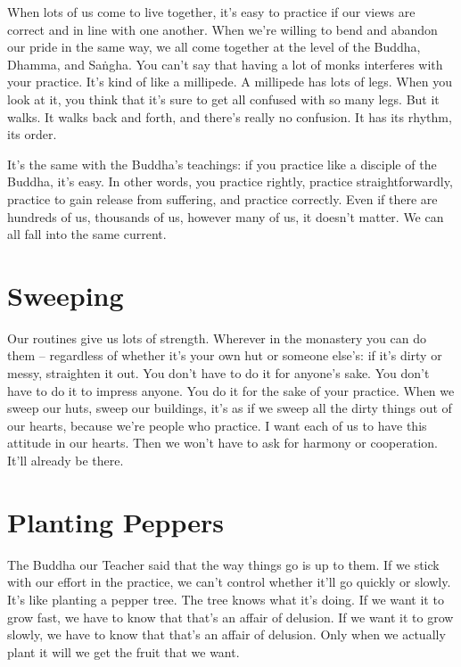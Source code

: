 When lots of us come to live together, it's easy to practice if our views are correct and in line with one another. When we're willing to bend and abandon our pride in the same way, we all come together at the level of the Buddha, Dhamma, and Sa\.ngha. You can't say that having a lot of monks interferes with your practice. It's kind of like a millipede. A millipede has lots of legs. When you look at it, you think that it's sure to get all confused with so many legs. But it walks. It walks back and forth, and there's really no confusion. It has its rhythm, its order. 

It's the same with the Buddha's teachings: if you practice like a disciple of the Buddha, it's easy. In other words, you practice rightly, practice straightforwardly, practice to gain release from suffering, and practice correctly. Even if there are hundreds of us, thousands of us, however many of us, it doesn't matter. We can all fall into the same current.

\clearpage

\section{Sweeping}

Our routines give us lots of strength. Wherever in the monastery you can do them -- regardless of whether it's your own hut or someone else's: if it's dirty or messy, straighten it out. You don't have to do it for anyone's sake. You don't have to do it to impress anyone. You do it for the sake of your practice. When we sweep our huts, sweep our buildings, it's as if we sweep all the dirty things out of our hearts, because we're people who practice. I want each of us to have this attitude in our hearts. Then we won't have to ask for harmony or cooperation. It'll already be there.

\vspace*{-\baselineskip}
\section{Planting Peppers}

\enlargethispage{2\baselineskip}
The Buddha our Teacher said that the way things go is up to them. If we stick with our effort in the practice, we can't control whether it'll go quickly or slowly. It's like planting a pepper tree. The tree knows what it's doing. If we want it to grow fast, we have to know that that's an affair of delusion. If we want it to grow slowly, we have to know that that's an affair of delusion. Only when we actually plant it will we get the fruit that we want.

